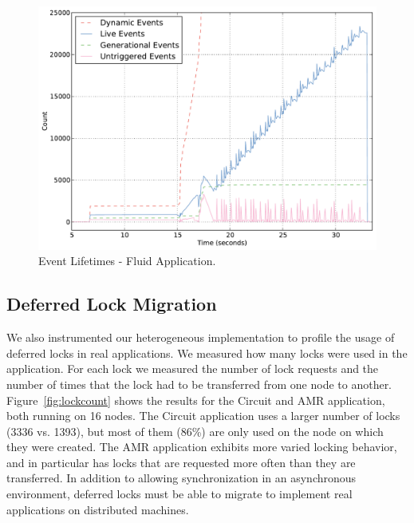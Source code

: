 \begin{figure}
\begin{center}
\includegraphics[scale=0.33]{figs/event_lifetimes.pdf}
\end{center}
\vspace{-6mm}
\caption{Event Lifetimes - Fluid Application.\label{fig:eventlife}}
\vspace{-2mm}
\end{figure}


\subsection{Deferred Lock Migration}
\label{subsec:lockmig}

We also instrumented our heterogeneous implementation to profile the usage of 
deferred locks in real applications.  We measured how many locks were used in the application.  For
each lock we measured the number of lock requests and the number of times that the lock
had to be transferred from one node to another.  Figure~\ref{fig:lockcount} shows the results 
for the Circuit and AMR application, both running on 16 nodes.  The Circuit application uses
a larger number of locks (3336 vs. 1393), but most of them (86\%) are only used on the node on 
which they were created.  The AMR application exhibits more varied locking behavior, and in 
particular has locks that are requested more often than they are transferred.  In addition
to allowing synchronization in an asynchronous environment, deferred locks must be able to 
migrate to implement real applications on distributed machines.


